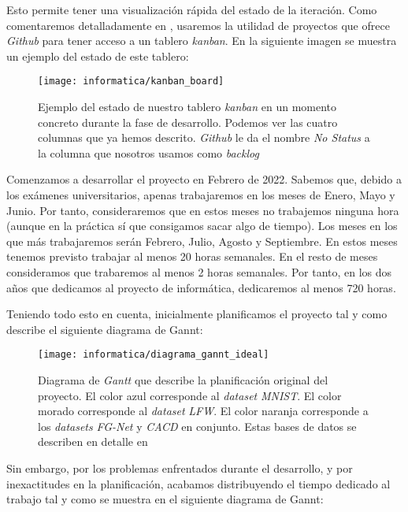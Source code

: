Esto permite tener una visualización rápida del estado de la iteración. Como comentaremos detalladamente en , usaremos la utilidad de proyectos que ofrece \textit{Github} para tener acceso a un tablero \textit{kanban}. En la siguiente imagen se muestra un ejemplo del estado de este tablero:

\begin{figure}[H]
    \centering
    \texttt{[image: informatica/kanban\_board]}
    \caption{Ejemplo del estado de nuestro tablero \textit{kanban} en un momento concreto durante la fase de desarrollo. Podemos ver las cuatro columnas que ya hemos descrito. \textit{Github} le da el nombre \textit{No Status} a la columna que nosotros usamos como \textit{backlog}}
\end{figure}

Comenzamos a desarrollar el proyecto en Febrero de 2022. Sabemos que, debido a los exámenes universitarios, apenas trabajaremos en los meses de Enero, Mayo y Junio. Por tanto, consideraremos que en estos meses no trabajemos ninguna hora (aunque en la práctica sí que consigamos sacar algo de tiempo). Los meses en los que más trabajaremos serán Febrero, Julio, Agosto y Septiembre. En estos meses tenemos previsto trabajar al menos 20 horas semanales. En el resto de meses consideramos que trabaremos al menos 2 horas semanales. Por tanto, en los dos años que dedicamos al proyecto de informática, dedicaremos al menos 720 horas.

Teniendo todo esto en cuenta, inicialmente planificamos el proyecto tal y como describe el siguiente diagrama de Gannt:

\begin{figure}[H]
    \centering
    \texttt{[image: informatica/diagrama\_gannt\_ideal]}
    \caption{Diagrama de \textit{Gantt} que describe la planificación original del proyecto. El color azul corresponde al \textit{dataset} \textit{MNIST}. El color morado corresponde al \textit{dataset} \textit{LFW}. El color naranja corresponde a los \textit{datasets} \textit{FG-Net} y \textit{CACD} en conjunto. Estas bases de datos se describen en detalle en }
\end{figure}

Sin embargo, por los problemas enfrentados durante el desarrollo, y por inexactitudes en la planificación, acabamos distribuyendo el tiempo dedicado al trabajo tal y como se muestra en el siguiente diagrama de Gannt:

